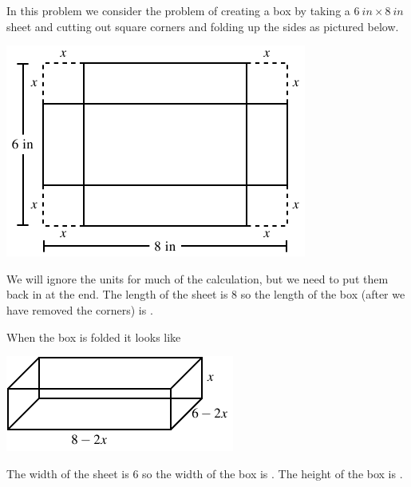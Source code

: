 \documentclass{ximera}
\begin{document}
\begin{question}
In this problem we consider the problem of creating a box by taking a $\SI{6}{in}\times\SI{8}{in}$ sheet and cutting out square corners and folding up the sides as pictured below.
\begin{image}
\includegraphics{Optimization1.png}
\end{image}

We will ignore the units for much of the calculation, but we need to put them back in at the end. The length of the sheet is $8$ so the length of the box (after we have removed the corners) is .
\begin{hint}
When the box is folded it looks like
\begin{image}
\includegraphics{Optimization2.png}
\end{image}
\end{hint}
The width of the sheet is $6$ so the width of the box is . The height of the box is . 


\end{question}
\end{document}

